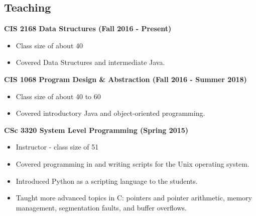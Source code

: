 \documentclass{res}
\begin{document}
\begin{resume}

\newpage
\section{Teaching}


\textbf{CIS 2168 Data Structures (Fall 2016 -  Present)}
\begin{itemize}
	\item Class size of about 40 
	\item Covered Data Structures and intermediate Java.
\end{itemize}


\textbf{CIS 1068 Program Design \& Abstraction (Fall 2016 -  Summer 2018)}
\begin{itemize}
	\item Class size of about 40 to 60
	\item Covered introductory Java and object-oriented programming.
\end{itemize}




{\bf CSc 3320  System Level Programming (Spring 2015) }
\begin{itemize}
	\item Instructor - class size of 51
	\item Covered programming in and writing scripts for the Unix operating system.
	\item Introduced Python as a scripting language to the students.
	\item Taught more advanced topics in C: pointers and pointer arithmetic, memory management, segmentation faults, and buffer overflows.
\end{itemize}



\end{resume}
\end{document}
